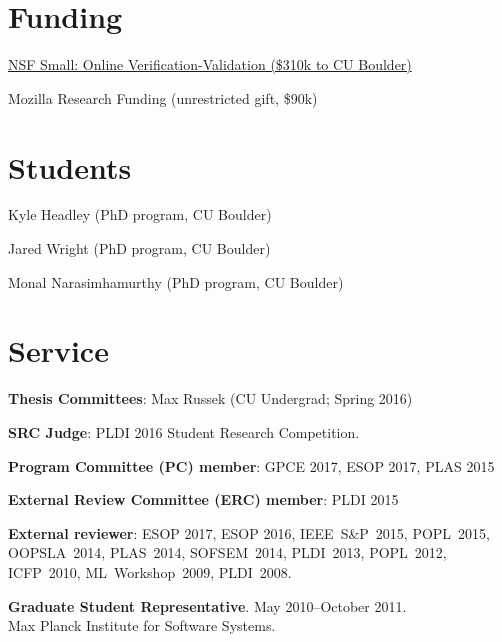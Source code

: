 \documentclass[10pt,letterpaper]{article}
\renewenvironment{itemize}{
  \begin{list}{}{
    \setlength{\leftmargin}{1.5em}
    \setlength{\itemsep}{0.25em}
    \setlength{\parskip}{0pt}
    \setlength{\parsep}{0.25em}
  }
}{
  \end{list}
}
\begin{document}
\section*{Funding}
\begin{itemize}
\item \href{https://www.nsf.gov/awardsearch/showAward?AWD_ID=1619282}
  {NSF Small: Online Verification-Validation (\$310k to CU Boulder)}
\item Mozilla Research Funding (unrestricted gift, \$90k)
\end{itemize}

\section*{Students}

\begin{itemize}
\item Kyle Headley (PhD program, CU Boulder)
\item Jared Wright (PhD program, CU Boulder)
\item Monal Narasimhamurthy (PhD program, CU Boulder)
\end{itemize}

\section*{Service}

\begin{itemize}

\item \textbf{Thesis Committees}:
  Max Russek (CU Undergrad; Spring 2016)

\item \textbf{SRC Judge}:
  PLDI 2016 Student Research Competition.
  
\item \textbf{Program Committee (PC) member}:
  GPCE 2017,
  ESOP 2017,
  PLAS 2015

\item \textbf{External Review Committee (ERC) member}: PLDI 2015

\item \textbf{External reviewer}:
ESOP 2017,  
ESOP 2016,  
IEEE~S\&P~2015,
POPL~2015, %
OOPSLA~2014, %
PLAS~2014, %
SOFSEM~2014, %
PLDI~2013, %
POPL~2012, 
ICFP~2010, 
ML~Workshop~2009, 
PLDI~2008.

\item \textbf{Graduate Student Representative}.  
  May 2010--October 2011.
  \\
  Max Planck Institute for Software Systems.

  
\end{itemize}
\end{document}
